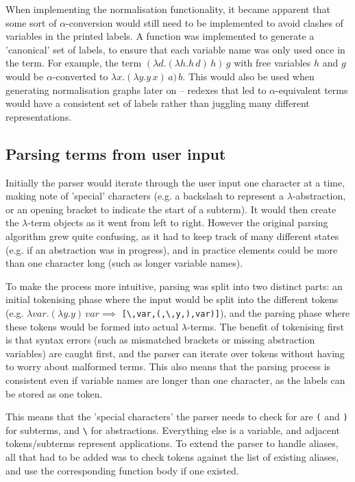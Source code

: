 \documentclass[11pt]{article}
\begin{document}
When implementing the normalisation functionality, it became apparent that some sort of $\alpha$-conversion would still need to be implemented to avoid clashes of variables in the printed labels. A function was implemented to generate a 'canonical' set of labels, to ensure that each variable name was only used once in the term. For example, the term $(\lambda d. (\lambda h. h \, d) \, h) \, g$ with free variables $h$ and $g$ would be $\alpha$-converted to $\lambda x. (\lambda y. y \, x) \, a) \, b$. This would also be used when generating normalisation graphs later on -- redexes that led to $\alpha$-equivalent terms would have a consistent set of labels rather than juggling many different representations.

\subsection{Parsing terms from user input}
Initially the parser would iterate through the user input one character at a time, making note of 'special' characters (e.g. a backslash to represent a $\lambda$-abstraction, or an opening bracket to indicate the start of a subterm). It would then create the $\lambda$-term objects as it went from left to right. However the original parsing algorithm grew quite confusing, as it had to keep track of many different states (e.g. if an abstraction was in progress), and in practice elements could be more than one character long (such as longer variable names).

To make the process more intuitive, parsing was split into two distinct parts: an initial tokenising phase where the input would be split into the different tokens (e.g. $\lambda var. (\lambda y. y) \, var \implies$ \texttt{[\textbackslash,var,(,\textbackslash,y,),var)]}), and the parsing phase where these tokens would be formed into actual $\lambda$-terms. The benefit of tokenising first is that syntax errors (such as mismatched brackets or missing abstraction variables) are caught first, and the parser can iterate over tokens without having to worry about malformed terms. This also means that the parsing process is consistent even if variable names are longer than one character, as the labels can be stored as one token. 

This means that the 'special characters' the parser needs to check for are \texttt{(} and \texttt{)} for subterms, and \texttt{\textbackslash} for abstractions. Everything else is a variable, and adjacent tokens/subterms represent applications. To extend the parser to handle aliases, all that had to be added was to check tokens against the list of existing aliases, and use the corresponding function body if one existed.
\end{document}
